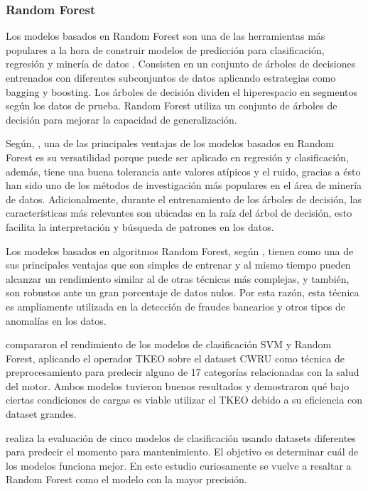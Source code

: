 \documentclass[11pt,a4paper,spanish]{book}
\numberwithin{equation}{chapter}
\numberwithin{figure}{chapter}
\begin{document}
\subsubsection{Random Forest}


Los modelos basados en Random Forest son una de las herramientas más populares a la 
hora de construir modelos de predicción para clasificación, regresión y minería de 
datos \cite{rushall2013rf}. Consisten en un conjunto de árboles de decisiones entrenados 
con diferentes subconjuntos de datos aplicando estrategias como bagging y boosting. 
Los árboles de decisión dividen el hiperespacio en segmentos según los datos de prueba. 
Random Forest utiliza un conjunto de árboles de decisión para mejorar la capacidad de 
generalización.  


Según, \cite{salman2024rf}, una de las principales ventajas de los modelos basados en 
Random Forest es su versatilidad porque puede ser aplicado en regresión y clasificación, 
además, tiene una buena tolerancia ante valores atípicos y el ruido, gracias a ésto han 
sido uno de los métodos de investigación más populares en el área de minería de datos. 
Adicionalmente, durante el entrenamiento de los árboles de decisión, las características 
más relevantes son ubicadas en la raíz del árbol de decisión, esto facilita la 
interpretación y búsqueda de patrones en los datos. 


Los modelos basados en algoritmos Random Forest, según \cite{canovas2017random}, tienen 
como una de sus principales ventajas que son simples de entrenar y al mismo tiempo 
pueden alcanzar un rendimiento similar al de otras técnicas más complejas, y también, 
son robustos ante un gran porcentaje de datos nulos. Por esta razón, esta técnica es 
ampliamente utilizada en la detección de fraudes bancarios y otros tipos de anomalías 
en los datos. 


\cite{yu2025tkeo} compararon el rendimiento de los modelos de clasificación SVM  y 
Random Forest, aplicando el operador TKEO sobre el dataset CWRU como técnica de 
preprocesamiento para predecir alguno de 17 categorías relacionadas con la salud del 
motor. Ambos modelos tuvieron buenos resultados y demostraron qué bajo ciertas 
condiciones de cargas es viable utilizar el TKEO debido a su eficiencia con dataset 
grandes.


\cite{sharma2022predictive} realiza la evaluación de cinco modelos de clasificación 
usando datasets diferentes para predecir el momento para mantenimiento. 
El objetivo es determinar cuál de los modelos funciona mejor. En este estudio 
curiosamente se vuelve a resaltar a Random Forest como el modelo con la mayor precisión.
\end{document}
